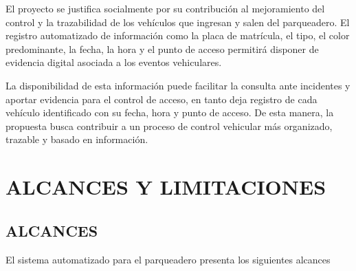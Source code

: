 El proyecto se justifica socialmente por su contribución al mejoramiento del
control y la trazabilidad de los vehículos que ingresan y salen del parqueadero.
El registro automatizado de información como la placa de matrícula, el tipo, el
color predominante, la fecha, la hora y el punto de acceso permitirá disponer de
evidencia digital asociada a los eventos vehiculares.

La disponibilidad de esta información puede facilitar la consulta ante incidentes
y aportar evidencia para el control de acceso, en tanto deja registro de cada
vehículo identificado con su fecha, hora y punto de acceso. De esta manera, la
propuesta busca contribuir a un proceso de control vehicular más organizado,
trazable y basado en información.

\section*{ALCANCES Y LIMITACIONES}

\subsection*{ALCANCES}

El sistema automatizado para el parqueadero
presenta los siguientes alcances

